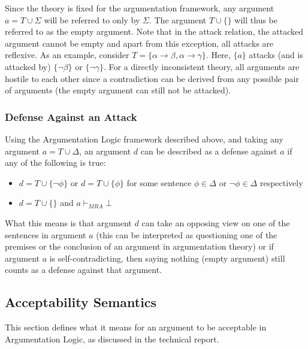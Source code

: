 \documentclass[11pt,twoside,a4paper]{report}
\begin{document}
Since the theory is fixed for the argumentation framework, any argument $a = T\cup\Sigma$  will be referred to only by $\Sigma$. The argument $T\cup\{\}$ will thus be referred to as the empty argument. Note that in the attack relation, the attacked argument cannot be empty and apart from this exception, all attacks are reflexive.
As an example, consider $T = \{\alpha\rightarrow\beta, \alpha\rightarrow\gamma\}$. Here, $\{a\}$ attacks (and is attacked by) $\{\neg\beta\}$ or $\{\neg\gamma\}$. For a directly inconsistent theory, all arguments are hostile to each other since a contradiction can be derived from any possible pair of arguments (the empty argument can still not be attacked).

\subsubsection{Defense Against an Attack}
\label{subsec:alfdef2}
Using the Argumentation Logic framework described above, and taking any argument $a = T\cup\Delta$, an argument $d$ can be described as a defense against $a$ if any of the following is true:
\begin{itemize}
\item
$d = T\cup\{\neg\phi\}$ or $d = T\cup\{\phi\}$ for some sentence $\phi\in\Delta$ or $\neg\phi\in\Delta$ respectively
\item
$d = T\cup\{\}$ and $a\vdash_{MRA}\bot$
\end{itemize}

What this means is that argument $d$ can take an opposing view on one of the sentences in argument $a$ (this can be interpreted as questioning one of the premises or the conclusion of an argument in argumentation theory) or if argument $a$ is self-contradicting, then saying nothing (empty argument) still counts as a defense against that argument.

\subsection{Acceptability Semantics}
This section defines what it means for an argument to be acceptable in Argumentation Logic, as discussed in the technical report.
\end{document}
